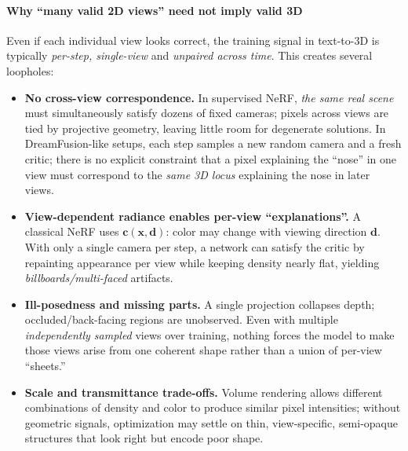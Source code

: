 \begin{enrichment}
\begin{enrichment}
        \paragraph{Why “many valid 2D views” need not imply valid 3D}
        Even if each individual view looks correct, the training signal in text-to-3D is typically \emph{per-step, single-view} and \emph{unpaired across time}. This creates several loopholes:
        
        \begin{itemize}
            \item \textbf{No cross-view correspondence.} In supervised NeRF, \emph{the same real scene} must simultaneously satisfy dozens of fixed cameras; pixels across views are tied by projective geometry, leaving little room for degenerate solutions. In DreamFusion-like setups, each step samples a new random camera and a fresh critic; there is no explicit constraint that a pixel explaining the “nose” in one view must correspond to the \emph{same 3D locus} explaining the nose in later views.
            \item \textbf{View-dependent radiance enables per-view “explanations”.} A classical NeRF uses \(\mathbf{c}(\mathbf{x},\mathbf{d})\): color may change with viewing direction \(\mathbf{d}\). With only a single camera per step, a network can satisfy the critic by repainting appearance per view while keeping density nearly flat, yielding \emph{billboards/multi-faced} artifacts.
            \item \textbf{Ill-posedness and missing parts.} A single projection collapses depth; occluded/back-facing regions are unobserved. Even with multiple \emph{independently sampled} views over training, nothing forces the model to make those views arise from one coherent shape rather than a union of per-view “sheets.”
            \item \textbf{Scale and transmittance trade-offs.} Volume rendering allows different combinations of density and color to produce similar pixel intensities; without geometric signals, optimization may settle on thin, view-specific, semi-opaque structures that look right but encode poor shape.
        \end{itemize}
        
        \newpage
        

\end{enrichment}
\end{enrichment}
